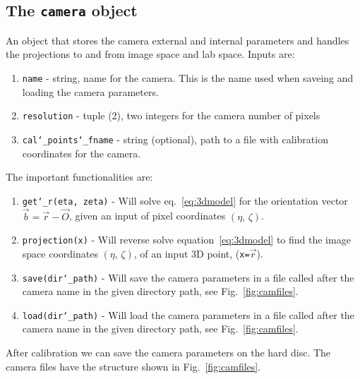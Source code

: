 \documentclass[10pt,a4paper]{article}
\begin{document}
\subsection{The \texttt{camera} object}

An object that stores the camera external and internal parameters and handles the projections to and from image space and lab space. Inputs are:

\begin{enumerate}
	\item \texttt{name} - string, name for the camera. This is the name used when saveing and loading the camera parameters.
	\item \texttt{resolution} - tuple (2), two integers for the camera number of pixels
	\item \texttt{cal\char`_points\char`_fname} - string (optional), path to a file with calibration coordinates for the camera.
\end{enumerate}


The important functionalities are:


\begin{enumerate}
	\item \texttt{get\char`_r(eta, zeta)} - Will solve eq.~\ref{eq:3dmodel} for the orientation vector $\vec{b} = \vec{r} - \vec{O}$, given an input of pixel coordinates $(\eta, \, \zeta)$.
	
	\item \texttt{projection(x)} - Will reverse solve equation~\eqref{eq:3dmodel} to find the image space coordinates $(\eta, \, \zeta)$, of an input 3D point, (\texttt{x=}$\vec{r}$).
	
	\item \texttt{save(dir\char`_path)} - Will save the camera parameters in a file called after the camera name in the given directory path, see Fig.~\ref{fig:camfiles}.
	
	\item \texttt{load(dir\char`_path)} - Will load the camera parameters in a file called after the camera name in the given directory path, see Fig.~\ref{fig:camfiles}.
\end{enumerate}



After calibration we can save the camera parameters on the hard disc. The camera files have the structure shown in Fig.~\ref{fig:camfiles}.
\end{document}
